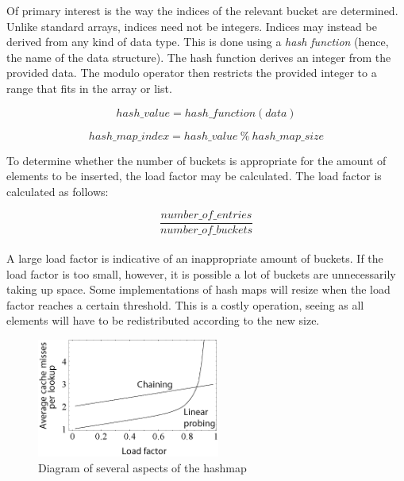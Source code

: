 \documentclass{article}
\begin{document}
\begin{samepage}
  Of primary interest is the way the indices of the relevant bucket are determined. Unlike standard arrays,
  indices need not be integers. Indices may instead be derived from any kind of data type. This is done using
  a {\em hash function} (hence, the name of the data structure). The hash function derives an integer from the
  provided data. The modulo operator then restricts the provided integer to a range that fits in the array or list.
  
  \begin{equation}
    hash\_value = hash\_function(data)
  \end{equation}
  
  \begin{equation}
    hash\_map\_index = hash\_value \ \% \ hash\_map\_size
  \end{equation}
\end{samepage}

\begin{samepage}
  To determine whether the number of buckets is appropriate for the amount of elements to be inserted,
  the load factor may be calculated. The load factor is calculated as follows:
  
  \begin{equation}
    \frac{number\_of\_entries}{number\_of\_buckets}
  \end{equation}

  \paragraph{}
  A large load factor is indicative of an inappropriate amount of buckets.
  If the load factor is too small, however, it is possible a lot of buckets are unnecessarily taking up space.
  Some implementations of hash maps will resize when the load factor reaches a certain threshold.
  This is a costly operation, seeing as all elements will have to be redistributed according to the new size.
\end{samepage}

\begin{figure}[H]
  \centering
  \includegraphics[width=6cm]{load_factor}
  \caption{Diagram of several aspects of the hashmap}
\end{figure}
\end{document}

